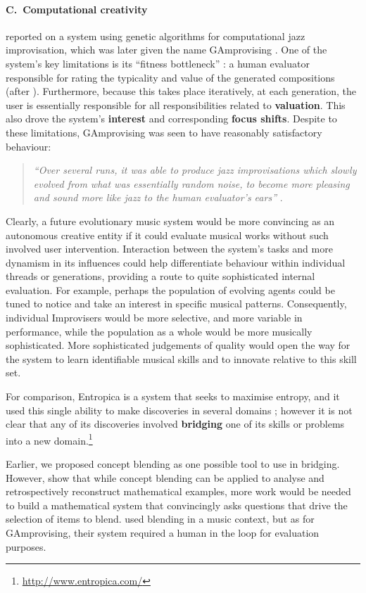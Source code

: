 \paragraph{C.~Computational creativity}
\citet{jordanous10} reported on a system using genetic algorithms for
computational jazz improvisation, which was later given the name {\sf
  GAmprovising} \citep{jordanous:12}.  One of the system's key
limitations is its ``fitness bottleneck'' \cite{jordanous10}: a human
evaluator responsible for rating the typicality and value of the
generated compositions (after \citet{ritchie2007some}).  Furthermore,
because this takes place iteratively, at each generation, the user is
essentially responsible for all responsibilities related to
\textbf{valuation}.  This also drove the system's \textbf{interest}
and corresponding \textbf{focus shifts}.  Despite to these
limitations, {\sf GAmprovising} was seen to have reasonably
satisfactory behaviour:
\begin{quote}
\emph{``Over several runs, it was able to produce jazz improvisations which
slowly evolved from what was essentially random noise, to become more
pleasing and sound more like jazz to the human evaluator's ears''}
\mbox{\cite{jordanous10}}.
\end{quote}
Clearly, a future evolutionary music system would be more convincing
as an autonomous creative entity if it could evaluate musical works
without such involved user intervention.  Interaction between the system's tasks and
more dynamism in its influences could help differentiate behaviour
within individual threads or generations, providing a route to quite
sophisticated internal evaluation.  For example, perhaps the
population of evolving agents could be tuned to notice and take an interest in specific
musical patterns.  Consequently, individual Improvisers would be more
selective, and more variable in performance, while the population as a
whole would be more musically sophisticated.  More sophisticated
judgements of quality would open the way for the system to learn
identifiable musical skills and to innovate relative to this skill
set.

For comparison, {\sf Entropica} is a system that seeks to maximise
entropy, and it used this single ability to make discoveries in
several domains \cite{wissner2013causal}; however it is not clear that
any of its discoveries involved \textbf{bridging} one of its skills or
problems into a new domain.\footnote{\url{http://www.entropica.com/}}

Earlier, we proposed concept blending as one possible tool to use in
bridging.  However, \citet{bou2015role} show that while concept
blending can be applied to analyse and retrospectively reconstruct
mathematical examples, more work would be needed to build a mathematical
system that convincingly asks questions that drive the selection of
items to blend.  \citet{kaliakatsos2016argument} used blending in a
music context, but as for {\sf GAmprovising}, their system required a human in
the loop for evaluation purposes.

